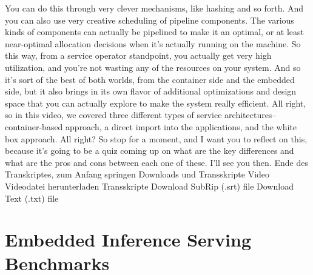 {{{{{{{     You can do this through very clever mechanisms, like hashing and so forth.
     And you can also use very creative scheduling of pipeline components.
     The various kinds of components can actually
     be pipelined to make it an optimal, or at least near-optimal allocation
     decisions when it's actually running on the machine.
     So this way, from a service operator standpoint,
     you actually get very high utilization, and you're not wasting
     any of the resources on your system.
     And so it's sort of the best of both worlds,
     from the container side and the embedded side,
     but it also brings in its own flavor of additional optimizations and design
     space that you can actually explore to make the system really efficient.
     All right, so in this video, we covered three different types of service
     architectures-- container-based approach,
     a direct import into the applications, and the white box approach.
     All right?
     So stop for a moment, and I want you to reflect on this,
     because it's going to be a quiz coming up on what are the key differences
     and what are the pros and cons between each one of these.
     I'll see you then.
     Ende des Transkriptes, zum Anfang springen
     Downloads und Transskripte
     Video
     Videodatei herunterladen
     Transskripte
     Download SubRip (.srt) file
     Download Text (.txt) file
 
\section{Embedded Inference Serving Benchmarks}

}}}}}}}
